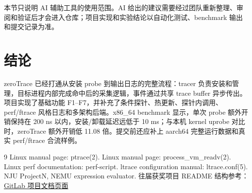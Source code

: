 \documentclass[UTF8,a4paper,11pt,fontset=fandol]{ctexart}
\begin{document}
本节只说明 AI 辅助工具的使用范围。AI 给出的建议需要经过团队重新整理、审阅和验证后才会进入仓库；项目实现和实验结论以自动化测试、benchmark 输出和提交记录为准。

\section{结论}

zeroTrace 已经打通从安装 probe 到输出日志的完整流程：tracer 负责安装和管理，目标进程内部完成命中后的采集逻辑，事件通过共享 trace buffer 异步传出。项目实现了基础功能 F1--F7，并补充了条件探针、热更新、探针内调用、perf/ftrace 风格日志和多架构后端。x86\_64 benchmark 显示，单次 probe 额外开销保持在 200 ns 以内，安装/卸载延迟远低于 10 ms；与本机 kernel uprobe 对比时，zeroTrace 额外开销低 11.08 倍。提交前还应补上 aarch64 完整运行数据和真实 perf/ftrace 合流样例。

\begin{thebibliography}{9}
Linux manual page: ptrace(2).
Linux manual page: process\_vm\_readv(2).
Linux perf documentation: perf-script.
ltrace configuration manual: ltrace.conf(5).
NJU ProjectN, NEMU expression evaluator.
往届获奖项目 README 结构参考：\href{https://gitlab.eduxiji.net/educg-group-35717-2721707/T202518123995935-3027}{GitLab 项目文档页面}
\end{thebibliography}
\end{document}
